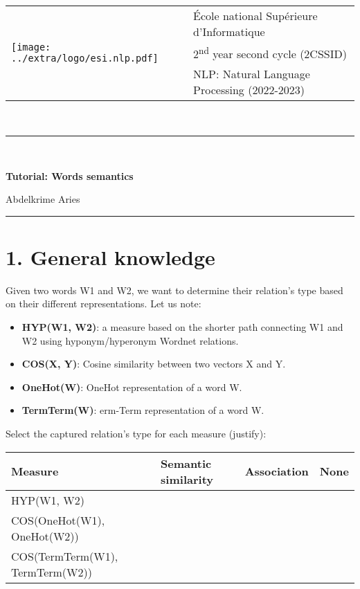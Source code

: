 \documentclass[11pt, a4paper]{article}
\begin{document}

\noindent
\begin{tabular}{ll}
\multirow{3}{*}{\texttt{[image: ../extra/logo/esi.nlp.pdf]}} & 
\'Ecole national Supérieure d'Informatique\\
& 2\textsuperscript{nd} year second cycle (2CSSID)\\
& NLP: Natural Language Processing (2022-2023)
\end{tabular}\\[.25cm]
\noindent\rule{\textwidth}{2pt}\\[-0.5cm]
\begin{center}
{\LARGE \textbf{Tutorial: Words semantics}}
\begin{flushright}
	Abdelkrime Aries
\end{flushright}
\end{center}\vspace{-0.5cm}
\noindent\rule{\textwidth}{2pt}

\section*{1. General knowledge}

Given two words W1 and W2, we want to determine their relation's type based on their different representations.
Let us note:
\begin{itemize}
	\item \textbf{HYP(W1, W2)}: a measure based on the shorter path connecting W1 and W2 using hyponym/hyperonym Wordnet relations.
	\item \textbf{COS(X, Y)}: Cosine similarity between two vectors X and Y.
	\item \textbf{OneHot(W)}: OneHot representation of a word W.
	\item \textbf{TermTerm(W)}: erm-Term representation of a word W.
\end{itemize}

\noindent
Select the captured relation's type for each measure (justify):
\begin{center}
	\begin{tabular}{|llll|}
	\hline 
	Measure & Semantic similarity & Association & None\\
	\hline
	HYP(W1, W2) & \Square & \Square & \Square \\
	COS(OneHot(W1), OneHot(W2)) & \Square & \Square & \Square \\
	COS(TermTerm(W1), TermTerm(W2)) & \Square & \Square & \Square \\
	\hline
	\end{tabular}
\end{center}
\end{document}

